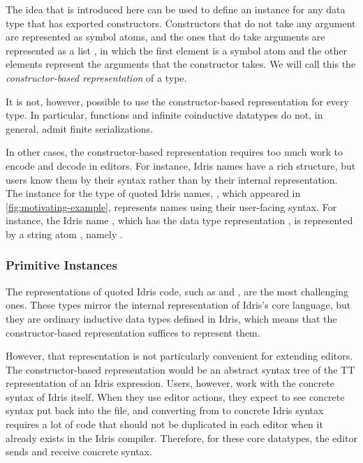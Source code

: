 The idea that is introduced here can be used to define an \Editorable{}
instance for any data type that has exported constructors. Constructors that do
not take any argument are represented as symbol atoms, and the ones that do
take arguments are represented as a list \sexp{}, in which the first element is
a symbol atom and the other elements represent the arguments that the
constructor takes. We will call this the \emph{constructor-based \sexp{}
representation} of a type.

It is not, however, possible to use the constructor-based representation for every type.
In particular, functions and infinite coinductive datatypes do not, in general, admit finite serializations.

In other cases, the constructor-based representation requires too much work to encode and decode in editors.
For instance, Idris names have a rich structure, but users know them by their syntax rather than by their internal representation.
The \Editorable{} instance for the type of quoted Idris
names, , which appeared in \autoref{fig:motivating-example}, represents names using their user-facing syntax.
For instance, the Idris name , which has the
data type representation , is
represented by a string atom \sexp{}, namely .

\subsubsection{Primitive \Editorable{} Instances}
\label{sssec:primitiveEditorable}

The \sexp{} representations of quoted Idris code, such as \TT{}  and
\TyDecl{}, are the most challenging ones. These types mirror the internal
representation of Idris's core language, but they are ordinary inductive data
types defined in Idris, which means that the constructor-based representation
suffices to represent them.

However, that representation is not particularly convenient for
extending editors.  The constructor-based representation would be an
abstract syntax tree of the \textsf{TT} representation of an Idris
expression. Users, however, work with the concrete syntax of Idris
itself. When they use editor actions, they expect to see concrete
syntax put back into the file, and converting from \TT{} to concrete
Idris syntax requires a lot of code that should not be duplicated in
each editor when it already exists in the Idris compiler. Therefore,
for these core datatypes, the editor sends and receive concrete
syntax.

